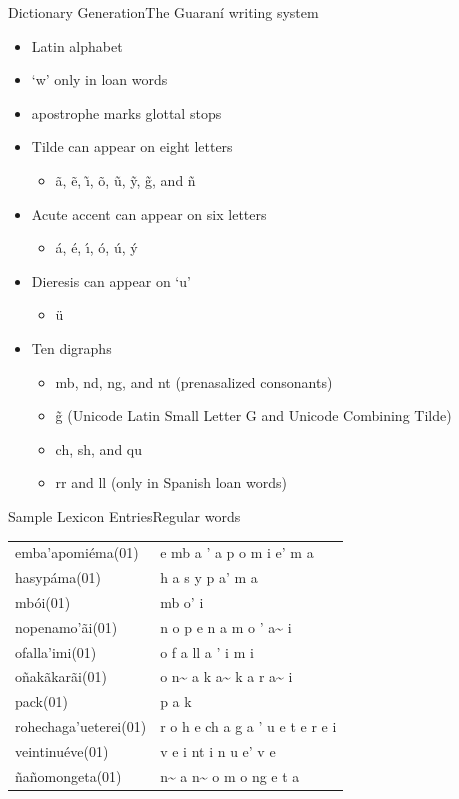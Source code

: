 \begin{frame}{Dictionary Generation}{The Guaran\'{i} writing system}
  \begin{itemize}
  \item Latin alphabet
  \item `w' only in loan words
  \item apostrophe marks glottal stops
  \item Tilde can appear on eight letters
    \begin{itemize}
    \item \~{a}, \~{e}, \~{\i}, \~{o}, \~{u}, \~{y}, \~{g}, and \~{n}
    \end{itemize}
  \item Acute accent can appear on six letters
    \begin{itemize}
    \item \'{a}, \'{e}, \'{\i}, \'{o}, \'{u}, \'{y}
    \end{itemize}
  \item Dieresis can appear on `u'
    \begin{itemize}
    \item \"{u}
    \end{itemize}
  \item Ten digraphs
    \begin{itemize}
    \item mb, nd, ng, and nt (prenasalized consonants)
    \item \~{g} (Unicode Latin Small Letter G and Unicode Combining Tilde)
    \item ch, sh, and qu
    \item rr and ll (only in Spanish loan words)
    \end{itemize}
  \end{itemize}
\end{frame}

\begin{frame}{Sample Lexicon Entries}{Regular words}
  \centering
  \begin{tabular}{@{}ll@{}}
    emba'apomi\'{e}ma(01) & e mb a ' a p o m i e' m a \\
    hasyp\'{a}ma(01) & h a s y p a' m a \\
    mb\'{o}i(01) & mb o' i \\
    nopenamo'\~{a}i(01) & n o p e n a m o ' a\~{} i \\
    ofalla'imi(01) & o f a ll a ' i m i \\
    o\~{n}ak\~{a}kar\~{a}i(01) & o n\~{} a k a\~{} k a r a\~{} i \\
    pack(01) & p a k \\
    rohechaga'ueterei(01) & r o h e ch a g a ' u e t e r e i \\
    veintinu\'{e}ve(01) & v e i nt i n u e' v e \\
    \~{n}a\~{n}omongeta(01) & n\~{} a n\~{} o m o ng e t a \\
  \end{tabular}
\end{frame}

